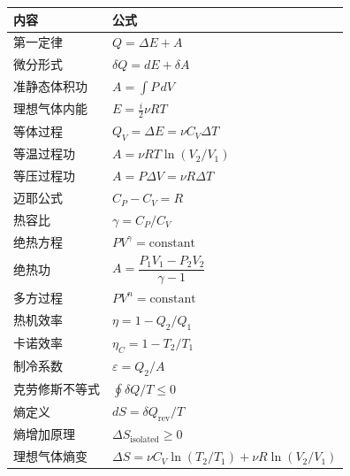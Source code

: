 \documentclass[
  a4paper,
]{ctexrep}
\begin{document}
\begin{longtable}[]{@{}ll@{}}
\toprule\noalign{}
内容 & 公式 \\
\midrule\noalign{}
\endhead
\bottomrule\noalign{}
\endlastfoot
第一定律 & \(Q=\Delta E+A\) \\
微分形式 & \(\delta Q=dE+\delta A\) \\
准静态体积功 & \(A=\int P\,dV\) \\
理想气体内能 & \(E=\frac{i}{2}\nu RT\) \\
等体过程 & \(Q_V=\Delta E=\nu C_V\Delta T\) \\
等温过程功 & \(A=\nu RT\ln(V_2/V_1)\) \\
等压过程功 & \(A=P\Delta V=\nu R\Delta T\) \\
迈耶公式 & \(C_P-C_V=R\) \\
热容比 & \(\gamma=C_P/C_V\) \\
绝热方程 & \(PV^\gamma=\mathrm{constant}\) \\
绝热功 & \(A=\dfrac{P_1V_1-P_2V_2}{\gamma-1}\) \\
多方过程 & \(PV^n=\mathrm{constant}\) \\
热机效率 & \(\eta=1-Q_2/Q_1\) \\
卡诺效率 & \(\eta_C=1-T_2/T_1\) \\
制冷系数 & \(\varepsilon=Q_2/A\) \\
克劳修斯不等式 & \(\oint \delta Q/T\leq 0\) \\
熵定义 & \(dS=\delta Q_{\mathrm{rev}}/T\) \\
熵增加原理 & \(\Delta S_{\mathrm{isolated}}\geq 0\) \\
理想气体熵变 & \(\Delta S=\nu C_V\ln(T_2/T_1)+\nu R\ln(V_2/V_1)\) \\
\end{longtable}
\end{document}
